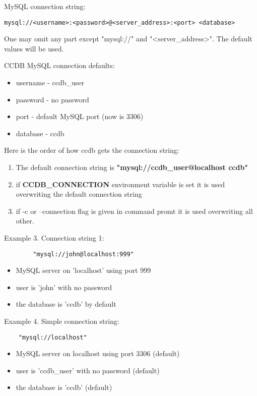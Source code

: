 \documentclass{article}
\begin{document}
MySQL connection string:
\begin{verbatim}
mysql://<username>:<password>@<server_address>:<port> <database>
\end{verbatim}

One may omit any part except "mysql://" and "<server\_address>". The default
values will be used.

CCDB MySQL connection defaults:
\begin{itemize}
  \item username - ccdb\_user
  \item password - no password
  \item port - default MySQL port (now is 3306)
  \item database - ccdb
\end{itemize}


Here is the order of how ccdb gets the connection string:
\begin{enumerate}
  \item The default connection string is  \textbf{"mysql://ccdb\_user@localhost ccdb"}

  \item if \textbf{CCDB\_CONNECTION} environment variable is set it is used overwriting
        the default connection string

  \item if -c or --connection flag is given in command promt it is used overwriting
        all other.
\end{enumerate}

Example 3. Connection string 1:

\begin{verbatim}
        "mysql://john@localhost:999"
\end{verbatim}


\begin{itemize}
  \item MySQL server on 'localhost' using port 999
  \item user is 'john' with no password
  \item the database is 'ccdb' by default
\end{itemize}

Example 4. Simple connection string:
\begin{verbatim}	
	"mysql://localhost"
\end{verbatim}

\begin{itemize}
  \item MySQL server on localhost using port 3306 (default)
  \item user is 'ccdb\_user' with no password (default)
  \item the database is 'ccdb' (default)
\end{itemize}
\end{document}
